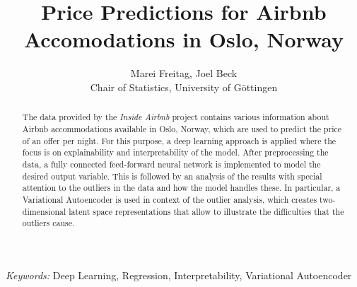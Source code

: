 \begin{titlepage}

    \title{\bf Price Predictions for Airbnb Accomodations in Oslo, Norway}

    \author{Marei Freitag, Joel Beck \hspace{.2cm}\\ Chair of Statistics, University of G\"ottingen\\}

    \maketitle

    \bigskip

    \begin{abstract}
        \noindent The data provided by the \emph{Inside Airbnb} project contains various information
        about Airbnb accommodations available in Oslo, Norway, which are used to predict the
        price of an offer per night. For this purpose, a deep learning approach is applied
        where the focus is on explainability and interpretability of the model. After
        preprocessing the data, a fully connected feed-forward neural network is implemented
        to model the desired output variable. This is followed by an analysis of the results
        with special attention to the outliers in the data and how the model handles these. 
        In particular, a Variational Autoencoder is used in context of the outlier
        analysis, which creates two-dimensional latent space representations that allow to
        illustrate the difficulties that the outliers cause.
    \end{abstract}

    \noindent%
    {\it Keywords:}  Deep Learning, Regression, Interpretability, Variational Autoencoder
    \vfill

\end{titlepage}
